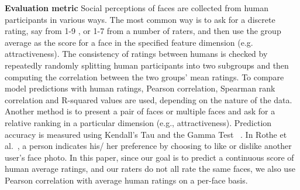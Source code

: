 \documentclass[10pt,twocolumn,letterpaper]{article}
\begin{document}
\textbf{Evaluation metric}
Social perceptions of faces are collected from human participants in various ways. The most common way is to ask for a discrete rating, say from 1-9
\cite{bainbridge2013intrinsic}, or 
1-7
\cite{eisenthal2006facial} from a number of raters, and then use the group average as the score for a face in the specified feature dimension (e.g. attractiveness). The consistency of ratings between humans is checked by repeatedly randomly splitting human participants into two subgroups and then computing the correlation between the two groups' mean ratings. To compare model predictions with human ratings, Pearson correlation\cite{kagian2008machine, dantcheva2011female}, Spearman rank correlation\cite{bainbridge2013intrinsic} and R-squared values\cite{mccurrie2016predicting} are used, 
depending on the nature of the data. Another method is to present a pair of faces or multiple faces and ask for a relative ranking in a particular dimension (e.g., attractiveness). Prediction accuracy is measured using Kendall's Tau and the Gamma Test
~\cite{altwaijry2013relative}. In Rothe et al.~\cite{rothe2015some}, a person indicates his/ her preference by choosing to  like or dislike another user's face photo.  In this paper, since our goal is to predict a continuous score of human average ratings, and our raters do not all rate the same faces, we also use Pearson correlation with average human ratings on a per-face basis.  
\end{document}
